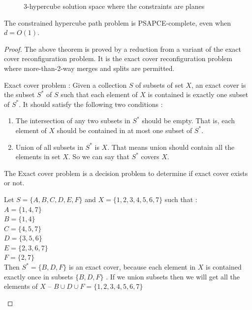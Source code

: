 \begin{example}
\end{example}
\begin{figure}[!h]
  \centering
  \def\svgscale{0.5}
   \def\svgwidth{width = 0.2}
  
  \caption{$3$-hypercube solution space where the constraints are planes}
\end{figure}

\begin{theorem}
The constrained hypercube path problem is PSAPCE-complete, even when $d = O(1)$. \cite{cardinal_reconfiguration_2018}
\end{theorem}

\begin{proof}
The above theorem is proved by a reduction from a variant of the exact cover reconfiguration problem. It is the exact cover reconfiguration problem where more-than-2-way merges and splits are permitted. 

\begin{defn}
Exact cover problem : Given a collection $S$ of subsets of set $X$, an exact cover is the subset $S^{*}$ of $S$ such that each element of $X$ is contained is exactly one subset of $S^{*}$. It should satisfy the following two conditions : 

\begin{enumerate}
    \item The intersection of any two subsets in $S^{*}$ should be empty. That is, each element of $X$ should be contained in at most one subset of $S^{*}$.
    \item Union of all subsets in $S^{*}$ is $X$. That means union should contain all the elements in set $X$. So we can say that $S^{*}$ covers $X$.
\end{enumerate}
The Exact cover problem is a decision problem to determine if exact cover exists or not. 
\end{defn}
\begin{example}
Let $S = \{A, B, C, D, E, F\}$ and $X = \{1, 2, 3, 4, 5, 6, 7\}$ such that :\\ 
$A = \{1, 4, 7\}$ \\
$B = \{1, 4\}$ \\
$C = \{4, 5, 7\}$ \\
$D = \{3, 5, 6\}$ \\
$E = \{2, 3, 6, 7\}$ \\
$F = \{2, 7\}$ \\
Then $S^* = \{B, D, F\}$ is an exact cover, because each element in $X$ is contained exactly once in subsets $\{B, D, F\}$ . If we union subsets then we will get all the elements of $X$ – $B \cup D \cup F = \{ 1,2,3,4,5,6,7\}$
\end{example}


\end{proof}
